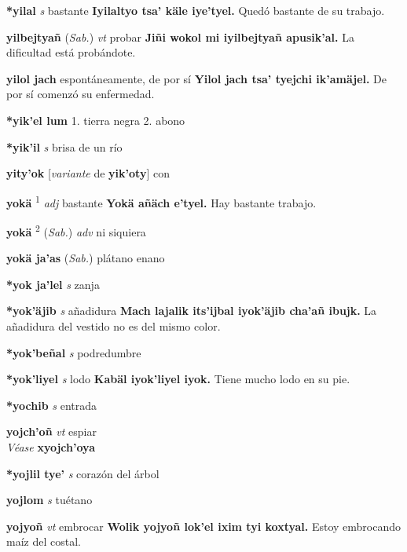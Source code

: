 \documentclass[10pt]{scrbook}
\newcommand{\entry}[1]{\textbf{#1}}
\newcommand{\onedefinition}[1]{#1.}
\newcommand{\defsuperscript}[1]{\textsuperscript{#1}}
\newcommand{\partofspeech}[1]{\textit{#1}}
\newcommand{\spanishtranslation}[1]{#1}
\newcommand{\cholexample}[1]{\textbf{#1}}
\newcommand{\exampletranslation}[1]{#1}
\newcommand{\alsosee}[1]{\\\textit{Véase} \textbf{#1}}
\newcommand{\relevantdialect}[1]{(\textit{#1})}
\newcommand{\conjugationtense}[1]{[\textit{#1}}
\newcommand{\conjugationverb}[1]{de \textbf{#1}]}
\begin{document}
\begin{multicols}{2}
\entry{*yilal}
\partofspeech{s}
\spanishtranslation{bastante}
\cholexample{Iyilaltyo tsa' käle iye'tyel.}
\exampletranslation{Quedó bastante de su trabajo.}

\entry{yilbejtyañ}
\relevantdialect{Sab.}
\partofspeech{vt}
\spanishtranslation{probar}
\cholexample{Jiñi wokol mi iyilbejtyañ apusik'al.}
\exampletranslation{La dificultad está probándote.}

\entry{yilol jach}
\spanishtranslation{espontáneamente, de por sí}
\cholexample{Yilol jach tsa' tyejchi ik'amäjel.}
\exampletranslation{De por sí comenzó su enfermedad.}

\entry{*yik'el lum}
\onedefinition{1}
\spanishtranslation{tierra negra}
\onedefinition{2}
\spanishtranslation{abono}

\entry{*yik'il}
\partofspeech{s}
\spanishtranslation{brisa de un río}

\entry{yity'ok}
\conjugationtense{variante}
\conjugationverb{yik'oty}
\spanishtranslation{con}

\entry{yokä}
\defsuperscript{1}
\partofspeech{adj}
\spanishtranslation{bastante}
\cholexample{Yokä añäch e'tyel.}
\exampletranslation{Hay bastante trabajo.}

\entry{yokä}
\defsuperscript{2}
\relevantdialect{Sab.}
\partofspeech{adv}
\spanishtranslation{ni siquiera}

\entry{yokä ja'as}
\relevantdialect{Sab.}
\spanishtranslation{plátano enano}

\entry{*yok ja'lel}
\partofspeech{s}
\spanishtranslation{zanja}

\entry{*yok'äjib}
\partofspeech{s}
\spanishtranslation{añadidura}
\cholexample{Mach lajalik its'ijbal iyok'äjib cha'añ ibujk.}
\exampletranslation{La añadidura del vestido no es del mismo color.}

\entry{*yok'beñal}
\partofspeech{s}
\spanishtranslation{podredumbre}

\entry{*yok'liyel}
\partofspeech{s}
\spanishtranslation{lodo}
\cholexample{Kabäl iyok'liyel iyok.}
\exampletranslation{Tiene mucho lodo en su pie.}

\entry{*yochib}
\partofspeech{s}
\spanishtranslation{entrada}

\entry{yojch'oñ}
\partofspeech{vt}
\spanishtranslation{espiar}
\alsosee{xyojch'oya}

\entry{*yojlil tye'}
\partofspeech{s}
\spanishtranslation{corazón del árbol}

\entry{yojlom}
\partofspeech{s}
\spanishtranslation{tuétano}

\entry{yojyoñ}
\partofspeech{vt}
\spanishtranslation{embrocar}
\cholexample{Wolik yojyoñ lok'el ixim tyi koxtyal.}
\exampletranslation{Estoy embrocando maíz del costal.}


\end{multicols}
\end{document}
